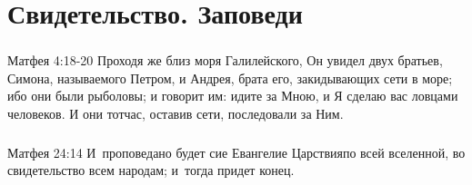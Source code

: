 \documentclass[t,aspectratio=169,14pt]{beamer}  %
\begin{document}
\section{Свидетельство. Заповеди}
\begin{frame}
	\frametitle{\insertsection}

	\begin{block}{Матфея 4:18-20}
		Проходя же близ моря Галилейского, Он увидел двух братьев, Симона, называемого Петром, и Андрея, брата его, закидывающих сети в море; 
		ибо они были рыболовы; и говорит им: \vspace{0.3cm}
		\linebreak идите за Мною, и Я сделаю вас ловцами человеков. \vspace{0.3cm}
		\linebreak И они тотчас, оставив сети, последовали за Ним.
	\end{block}
\end{frame} 
\begin{frame}
	\frametitle{\insertsection}

	\begin{block}{Матфея 24:14}
		И проповедано будет сие Евангелие Царствия\linebreak по всей вселенной,\linebreak 
		во свидетельство всем народам;\linebreak
		и тогда придет конец.
	\end{block}

\end{frame}



\end{document}
